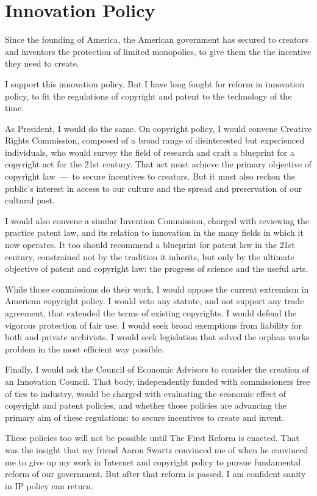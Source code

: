 \section{Innovation Policy}

Since the founding of America, the American government has secured to creators and inventors the protection of limited monopolies, to give them the the incentive they need to create.

I support this innovation policy. But I have long fought for reform in innovation policy, to fit the regulations of copyright and patent to the technology of the time.

As President, I would do the same. On copyright policy, I would convene Creative Rights Commission, composed of a broad range of disinterested but experienced individuals, who would survey the field of research and craft a blueprint for a copyright act for the 21st century. That act must achieve the primary objective of copyright law~---~to secure incentives to creators. But it must also reckon the public's interest in access to our culture and the spread and preservation of our cultural past.

I would also convene a similar Invention Commission, charged with reviewing the practice patent law, and its relation to innovation in the many fields in which it now operates. It too should recommend a blueprint for patent law in the 21st century, constrained not by the tradition it inherits, but only by the ultimate objective of patent and copyright law: the progress of science and the useful arts.

While those commissions do their work, I would oppose the current extremism in American copyright policy. I would veto any statute, and not support any trade agreement, that extended the terms of existing copyrights. I would defend the vigorous protection of fair use. I would seek broad exemptions from liability for both and private archivists. I would seek legislation that solved the orphan works problem in the most efficient way possible.

Finally, I would ask the Council of Economic Advisors to consider the creation of an Innovation Council. That body, independently funded with commissioners free of ties to industry, would be charged with evaluating the economic effect of copyright and patent policies, and whether those policies are advancing the primary aim of these regulations: to secure incentives to create and invent.

These policies too will not be possible until The First Reform is enacted. That was the insight that my friend Aaron Swartz convinced me of when he convinced me to give up my work in Internet and copyright policy to pursue fundamental reform of our government. But after that reform is passed, I am confident sanity in IP policy can return.
